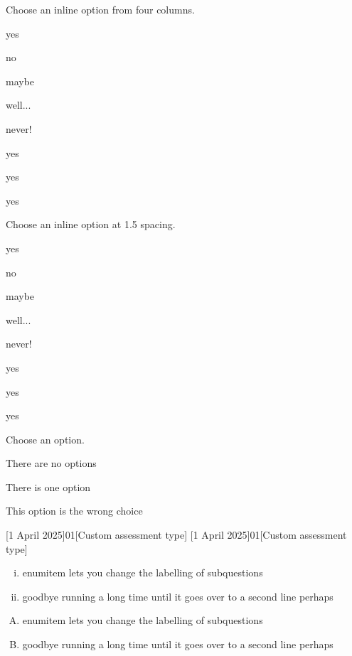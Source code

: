 \documentclass{outn}
\begin{document}
Choose an inline option from four columns.

\begin{inlineoptions}{4} %
\item yes
\item no
\item maybe
\item well...
\item never!
\item yes
\item yes
\item yes
\end{inlineoptions}

\question*
Choose an inline option at 1.5 spacing.
\begin{inlineoptions}[1.5]{3} %
\item yes
\item no
\item maybe
\item well...
\item never!
\item yes
\item yes
\item yes
\noitem %
\end{inlineoptions}

Choose an option.
\begin{options}
\item There are no options
\item There is one option
\item This option is the wrong choice
\end{options}


[1 April 2025]{01}[Custom assessment type]
[1 April 2025]{01}[Custom assessment type]

\begin{enumerate}[(i)]
\item enumitem lets you change the labelling of subquestions
\item goodbye running a long time until it goes over to a second line perhaps
\end{enumerate}

\begin{enumerate}[(A)]
\item enumitem lets you change the labelling of subquestions
\item goodbye running a long time until it goes over to a second line perhaps
\end{enumerate}
\end{document}
